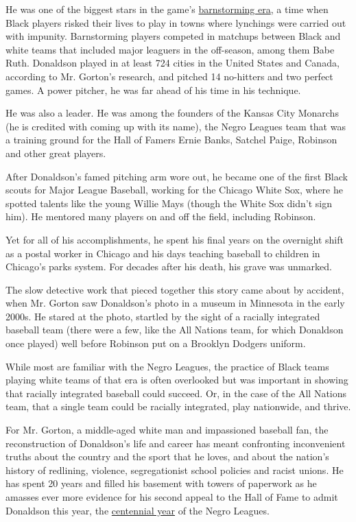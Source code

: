 He was one of the biggest stars in the game's
\href{https://baseballhall.org/discover-more/stories/baseball-history/road-to-equality}{barnstorming
era}, a time when Black players risked their lives to play in towns
where lynchings were carried out with impunity. Barnstorming players
competed in matchups between Black and white teams that included major
leaguers in the off-season, among them Babe Ruth. Donaldson played in at
least 724 cities in the United States and Canada, according to Mr.
Gorton's research, and pitched 14 no-hitters and two perfect games. A
power pitcher, he was far ahead of his time in his technique.

He was also a leader. He was among the founders of the Kansas City
Monarchs (he is credited with coming up with its name), the Negro
Leagues team that was a training ground for the Hall of Famers Ernie
Banks, Satchel Paige, Robinson and other great players.

After Donaldson's famed pitching arm wore out, he became one of the
first Black scouts for Major League Baseball, working for the Chicago
White Sox, where he spotted talents like the young Willie Mays (though
the White Sox didn't sign him). He mentored many players on and off the
field, including Robinson.

Yet for all of his accomplishments, he spent his final years on the
overnight shift as a postal worker in Chicago and his days teaching
baseball to children in Chicago's parks system. For decades after his
death, his grave was unmarked.

The slow detective work that pieced together this story came about by
accident, when Mr. Gorton saw Donaldson's photo in a museum in Minnesota
in the early 2000s. He stared at the photo, startled by the sight of a
racially integrated baseball team (there were a few, like the All
Nations team, for which Donaldson once played) well before Robinson put
on a Brooklyn Dodgers uniform.

While most are familiar with the Negro Leagues, the practice of Black
teams playing white teams of that era is often overlooked but was
important in showing that racially integrated baseball could succeed.
Or, in the case of the All Nations team, that a single team could be
racially integrated, play nationwide, and thrive.

For Mr. Gorton, a middle-aged white man and impassioned baseball fan,
the reconstruction of Donaldson's life and career has meant confronting
inconvenient truths about the country and the sport that he loves, and
about the nation's history of redlining, violence, segregationist school
policies and racist unions. He has spent 20 years and filled his
basement with towers of paperwork as he amasses ever more evidence for
his second appeal to the Hall of Fame to admit Donaldson this year, the
\href{https://www.mlb.com/news/negro-leaguers-in-the-national-baseball-hall-of-fame}{centennial
year} of the Negro Leagues.

